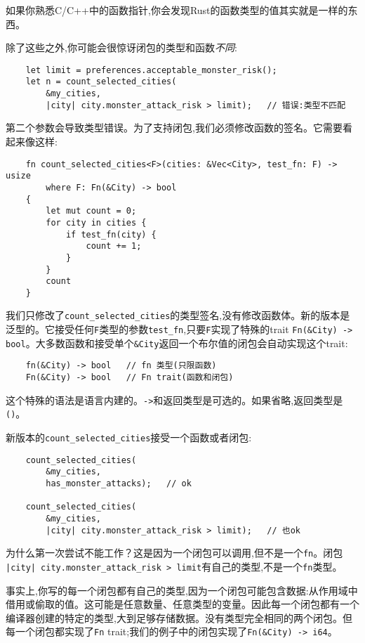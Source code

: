 如果你熟悉C/C++中的函数指针,你会发现Rust的函数类型的值其实就是一样的东西。

除了这些之外,你可能会很惊讶闭包的类型和函数\emph{不同}:
\begin{verbatim}
    let limit = preferences.acceptable_monster_risk();
    let n = count_selected_cities(
        &my_cities,
        |city| city.monster_attack_risk > limit);   // 错误:类型不匹配
\end{verbatim}

第二个参数会导致类型错误。为了支持闭包,我们必须修改函数的签名。它需要看起来像这样:
\begin{verbatim}
    fn count_selected_cities<F>(cities: &Vec<City>, test_fn: F) -> usize
        where F: Fn(&City) -> bool
    {
        let mut count = 0;
        for city in cities {
            if test_fn(city) {
                count += 1;
            }
        }
        count
    }
\end{verbatim}

我们只修改了\texttt{count\_selected\_cities}的类型签名,没有修改函数体。新的版本是泛型的。它接受任何\texttt{F}类型的参数\texttt{test\_fn},只要\texttt{F}实现了特殊的trait \texttt{Fn(\&City) -> bool}。大多数函数和接受单个\texttt{\&City}返回一个布尔值的闭包会自动实现这个trait:
\begin{verbatim}
    fn(&City) -> bool   // fn 类型(只限函数)
    Fn(&City) -> bool   // Fn trait(函数和闭包)
\end{verbatim}

这个特殊的语法是语言内建的。\texttt{->}和返回类型是可选的。如果省略,返回类型是\texttt{()}。

新版本的\texttt{count\_selected\_cities}接受一个函数或者闭包:
\begin{verbatim}
    count_selected_cities(
        &my_cities,
        has_monster_attacks);   // ok

    count_selected_cities(
        &my_cities,
        |city| city.monster_attack_risk > limit);   // 也ok
\end{verbatim}

为什么第一次尝试不能工作？这是因为一个闭包可以调用,但不是一个\texttt{fn}。闭包\\
\texttt{|city| city.monster\_attack\_risk > limit}有自己的类型,不是一个\texttt{fn}类型。

事实上,你写的每一个闭包都有自己的类型,因为一个闭包可能包含数据:从作用域中借用或偷取的值。这可能是任意数量、任意类型的变量。因此每一个闭包都有一个编译器创建的特定的类型,大到足够存储数据。没有类型完全相同的两个闭包。但每一个闭包都实现了\texttt{Fn} trait;我们的例子中的闭包实现了\texttt{Fn(\&City) -> i64}。


